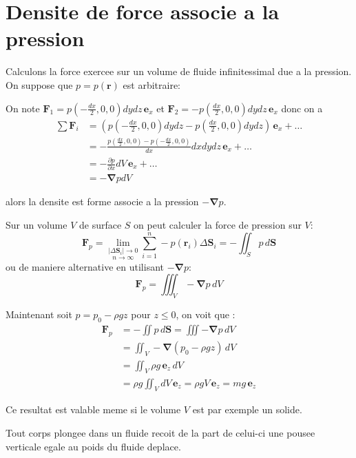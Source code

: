 \section{Densite de force associe a la pression}

Calculons la force exercee sur un volume de fluide infinitessimal due a la pression. On suppose que $p=p(\boldsymbol{r})$ est arbitraire:

On note $\boldsymbol{F}_{1}=p\left( -\frac{dx}{2},0,0\right)dydz\,\boldsymbol{e}_{x}$ et $\boldsymbol{F}_{2}=-p\left( \frac{dx}{2},0,0 \right)dydz\,\boldsymbol{e}_{x}$ donc on a 
\begin{align*}
\sum \boldsymbol{F}_{i} & =\left( p\left( -\frac{dx}{2},0,0 \right)dydz-p\left( \frac{dx}{2},0,0 \right)dydz \right)\,\boldsymbol{e}_{x} +\dots\\
 & =-\frac{p\left( \frac{dx}{2},0,0 \right)-p\left( -\frac{dx}{2},0,0 \right) }{dx}dxdydz\,\boldsymbol{e}_{x}+\dots \\
 & =-\frac{ \partial p }{ \partial x } dV\,\boldsymbol{e}_{x}+\dots \\
 & =-\boldsymbol{\nabla} pdV
\end{align*}

alors la densite est forme associe a la pression $-\boldsymbol{\nabla} p$.

\begin{example}
Sur un volume $V$ de surface $S$ on peut calculer la force de pression sur $V$:
$$
\boldsymbol{F}_{p}=\underset{n\to \infty}{\lim_{ |\Delta \boldsymbol{S}_{i}| \to 0 } }\sum_{i=1}^{n} -p(\boldsymbol{r}_{i})\Delta \boldsymbol{S}_{i}=-\iint _{S}p\,d\boldsymbol{S}
$$
ou de maniere alternative en utilisant $-\boldsymbol{\nabla} p$:
$$
\boldsymbol{F}_{p}=\iiint _{V}-\boldsymbol{\nabla} p\,dV
$$

Maintenant soit $p=p_{0}-\rho gz$ pour $z\le 0$, on voit que :
\begin{align*}
\boldsymbol{F}_{p} & =-\iint p\,d\boldsymbol{S}=\iiint-\boldsymbol{\nabla} p\,dV \\
 & =\iint _{V}-\boldsymbol{\nabla}(p_{0}-\rho gz)\,dV \\
 & =\iint _{V}\rho g\,\boldsymbol{e}_{z}\,dV \\
 & =\rho g\iint _{V}dV\,\boldsymbol{e}_{z}=\rho gV\,\boldsymbol{e}_{z}=mg\,\boldsymbol{e}_{z} 
\end{align*}
\end{example}

Ce resultat est valable meme si le volume $V$ est par exemple un solide.
\begin{proposition}
Tout corps plongee dans un fluide recoit de la part de celui-ci une pousee verticale egale au poids du fluide deplace.
\end{proposition}

